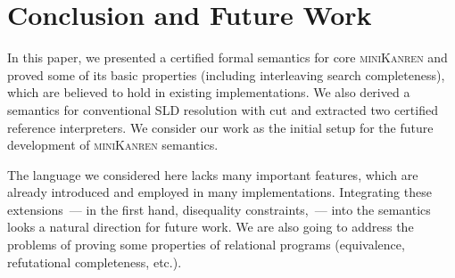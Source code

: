 \section{Conclusion and Future Work}

In this paper, we presented a certified formal semantics for core \textsc{miniKanren} and proved some of its basic properties
(including interleaving search completeness), which are believed to hold in existing implementations.
We also derived a semantics for conventional SLD resolution with cut and extracted two certified reference interpreters.
We consider our work as the initial setup for the future development of \textsc{miniKanren} semantics.

The language we considered here lacks many important features, which are already introduced
and employed in many implementations. Integrating these extensions~--- in the first hand, disequality constraints,~--- into
the semantics looks a natural direction for future work. We are also going to address the problems of proving some
properties of relational programs (equivalence, refutational completeness, etc.).
